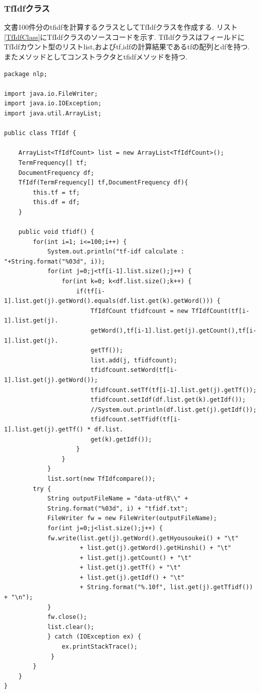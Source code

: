 \documentclass[a4j]{jarticle}
\begin{document}
\subsubsection{TfIdfクラス}
文書100件分のtfidfを計算するクラスとしてTfIdfクラスを作成する.
リスト\ref{TfIdfClass}にTfIdfクラスのソースコードを示す.
TfIdfクラスはフィールドにTfIdfカウント型のリストlist,およびtf,idfの計算結果であるtfの配列とdfを持つ.
またメソッドとしてコンストラクタとtfidfメソッドを持つ.
\begin{lstlisting}[basicstyle=\ttfamily\footnotesize, frame=single,label=TfIdfClass,caption=TfIdfクラスのソースコード]
package nlp;

import java.io.FileWriter;
import java.io.IOException;
import java.util.ArrayList;

public class TfIdf {

	ArrayList<TfIdfCount> list = new ArrayList<TfIdfCount>();
	TermFrequency[] tf;
	DocumentFrequency df;
	TfIdf(TermFrequency[] tf,DocumentFrequency df){
		this.tf = tf;
		this.df = df;
	}

	public void tfidf() {
		for(int i=1; i<=100;i++) {
			System.out.println("tf-idf calculate : "+String.format("%03d", i));
			for(int j=0;j<tf[i-1].list.size();j++) {
				for(int k=0; k<df.list.size();k++) {
					if(tf[i-1].list.get(j).getWord().equals(df.list.get(k).getWord())) {
						TfIdfCount tfidfcount = new TfIdfCount(tf[i-1].list.get(j).
						getWord(),tf[i-1].list.get(j).getCount(),tf[i-1].list.get(j).
						getTf());
						list.add(j, tfidfcount);
						tfidfcount.setWord(tf[i-1].list.get(j).getWord());
						tfidfcount.setTf(tf[i-1].list.get(j).getTf());
						tfidfcount.setIdf(df.list.get(k).getIdf());
						//System.out.println(df.list.get(j).getIdf());
						tfidfcount.setTfidf(tf[i-1].list.get(j).getTf() * df.list.
						get(k).getIdf());
					}
				}
			}
			list.sort(new TfIdfcompare());
		try {
			String outputFileName = "data-utf8\\" + 
			String.format("%03d", i) + "tfidf.txt";
			FileWriter fw = new FileWriter(outputFileName);
			for(int j=0;j<list.size();j++) {
			fw.write(list.get(j).getWord().getHyousoukei() + "\t"
					 + list.get(j).getWord().getHinshi() + "\t"
					 + list.get(j).getCount() + "\t"
					 + list.get(j).getTf() + "\t"
					 + list.get(j).getIdf() + "\t"
					 + String.format("%.10f", list.get(j).getTfidf()) + "\n");
			}
			fw.close();
			list.clear();
			} catch (IOException ex) {
				ex.printStackTrace();
			 }
		}
	}
}
\end{lstlisting}
\end{document}
